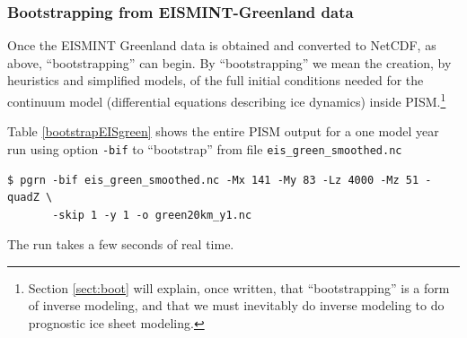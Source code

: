 \documentclass[11pt,final]{amsart}
\begin{document}
\subsubsection*{Bootstrapping from EISMINT-Greenland data}  Once the EISMINT Greenland data is obtained and converted to NetCDF, as above, ``bootstrapping'' can begin.  By ``bootstrapping'' we mean the creation, by heuristics and simplified models, of the full initial conditions needed for the continuum model (differential equations describing ice dynamics) inside PISM.\footnote{Section \ref{sect:boot} will explain, once written, that ``bootstrapping'' is a form of inverse modeling, and that we must inevitably do inverse modeling to do prognostic ice sheet modeling.}

Table \ref{bootstrapEISgreen} shows the entire PISM output for a one model year run using option \verb|-bif| to ``bootstrap'' from file \verb|eis_green_smoothed.nc|
\begin{verbatim}
$ pgrn -bif eis_green_smoothed.nc -Mx 141 -My 83 -Lz 4000 -Mz 51 -quadZ \
       -skip 1 -y 1 -o green20km_y1.nc
\end{verbatim}
\noindent The run takes a few seconds of real time.
\end{document}
